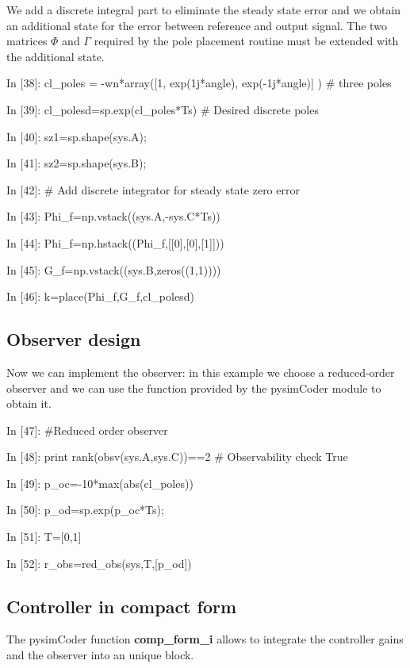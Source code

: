 We add a discrete integral part to eliminate the steady state error and we 
obtain an additional state for the error between reference and output signal. 
The two matrices $\Phi$ and $\Gamma$ required by the pole placement routine 
must be extended with the additional state.

\begin{code}

In [38]: cl_poles = -wn*array([1, exp(1j*angle), exp(-1j*angle)] ) # three poles

In [39]: cl_polesd=sp.exp(cl_poles*Ts)    # Desired discrete poles

In [40]: sz1=sp.shape(sys.A);

In [41]: sz2=sp.shape(sys.B);

In [42]: # Add discrete integrator for steady state zero error

In [43]: Phi_f=np.vstack((sys.A,-sys.C*Ts))

In [44]: Phi_f=np.hstack((Phi_f,[[0],[0],[1]]))

In [45]: G_f=np.vstack((sys.B,zeros((1,1))))

In [46]: k=place(Phi_f,G_f,cl_polesd)
\end{code}

\subsection{Observer design}

Now we can implement the observer: in this example we choose a reduced-order 
observer and we can use the function provided by the pysimCoder module to obtain
it.

\begin{code}
In [47]: #Reduced order observer

In [48]: print rank(obsv(sys.A,sys.C))==2     # Observability check
True

In [49]: p_oc=-10*max(abs(cl_poles))

In [50]: p_od=sp.exp(p_oc*Ts);

In [51]: T=[0,1]

In [52]: r_obs=red_obs(sys,T,[p_od])
\end{code}

\subsection{Controller in compact form}

The pysimCoder function \textbf{comp\_form\_i} allows to integrate the controller 
gains and the observer into an unique block.

